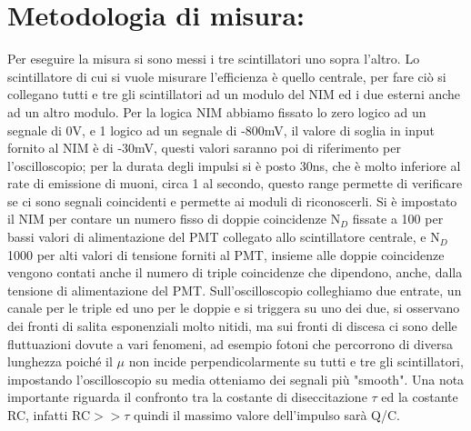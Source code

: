 \documentclass{article}
\begin{document}
\section{Metodologia di misura:}
Per eseguire la misura si sono messi i tre scintillatori uno sopra l'altro. Lo scintillatore di cui si vuole misurare l'efficienza è quello centrale, per fare ciò si collegano tutti e tre gli scintillatori ad un modulo del NIM ed i due esterni anche ad un altro modulo. Per la logica NIM abbiamo fissato lo zero logico ad un segnale di 0V, e 1 logico ad un segnale di -800mV, il valore di soglia in input fornito al NIM è di -30mV, questi valori saranno poi di riferimento per l'oscilloscopio; per la durata degli impulsi si è posto 30ns, che è molto inferiore al rate di emissione di muoni, circa 1 al secondo, questo range permette di verificare se ci sono segnali coincidenti e permette ai moduli di riconoscerli. Si è impostato il NIM per contare un numero fisso di doppie coincidenze N$_{D}$ fissate a 100 per bassi valori di alimentazione del PMT collegato allo scintillatore centrale, e N$_{D}$ 1000 per alti valori di tensione forniti al PMT, insieme alle doppie coincidenze vengono contati anche il numero di triple coincidenze che dipendono, anche, dalla tensione di alimentazione del PMT. Sull'oscilloscopio colleghiamo due entrate, un canale per le triple ed uno per le doppie e si triggera su uno dei due, si osservano dei fronti di salita esponenziali molto nitidi, ma sui fronti di discesa ci sono delle fluttuazioni dovute a vari fenomeni, ad esempio fotoni che percorrono di diversa lunghezza poiché il $\mu$ non incide perpendicolarmente su tutti e tre gli scintillatori, impostando l'oscilloscopio su media otteniamo dei segnali più "smooth". Una nota importante riguarda il confronto tra la costante di diseccitazione $\tau$ ed la costante RC, infatti RC$>>\tau$ quindi il massimo valore dell'impulso sarà Q/C.
~
\end{document}
